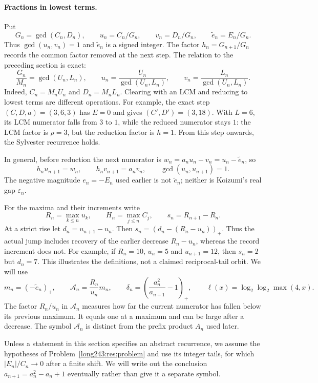 \documentclass[11pt]{article}
\begin{document}
\paragraph{Fractions in lowest terms.}
Put
\[
 G_n=\gcd(C_n,D_n),\qquad u_n=C_n/G_n,\qquad v_n=D_n/G_n,
 \qquad \tilde e_n=E_n/G_n.
\]
Thus $\gcd(u_n,v_n)=1$ and $\tilde e_n$ is a signed integer.
The factor $h_n=G_{n+1}/G_n$ records the common factor removed at the next
step. The relation to the preceding section is exact:
\[
 \frac{G_n}{M_n}=\gcd(U_n,L_n),\qquad
 u_n=\frac{U_n}{\gcd(U_n,L_n)},\qquad
 v_n=\frac{L_n}{\gcd(U_n,L_n)}.
\]
Indeed, $C_n=M_nU_n$ and $D_n=M_nL_n$.
Clearing with an LCM and reducing to lowest terms are different operations.
For example, the exact step $(C,D,a)=(3,6,3)$ has $E=0$ and gives
$(C',D')=(3,18)$. With $L=6$, its LCM numerator falls from $3$ to $1$,
while the reduced numerator stays $1$: the LCM factor is $\rho=3$,
but the reduction factor is $h=1$. From this step onwards, the Sylvester recurrence holds.

In general, before reduction the next numerator is
$w_n=a_nu_n-v_n=u_n-\tilde e_n$, so
\[
 h_nu_{n+1}=w_n,\qquad h_nv_{n+1}=a_nv_n,\qquad
 \gcd(u_n,u_{n+1})=1.
\]
The negative magnitude $e_n=-E_n$ used earlier is not $\tilde e_n$;
neither is Koizumi's real gap $\varepsilon_n$.

For the maxima and their increments write
\[
 R_n=\max_{k\le n}u_k,\qquad H_n=\max_{j\le n}C_j,
 \qquad s_n=R_{n+1}-R_n.
\]
At a strict rise let $d_n=u_{n+1}-u_n$. Then
$s_n=(d_n-(R_n-u_n))_+$. Thus the actual jump includes recovery of
the earlier decrease $R_n-u_n$, whereas the record increment does not. For example,
if $R_n=10$, $u_n=5$ and $u_{n+1}=12$, then $s_n=2$ but $d_n=7$.
This illustrates the definitions, not a claimed reciprocal-tail orbit.
We will use
\[
 m_n=(-\tilde e_n)_+,\qquad \mathcal A_n=\frac{R_n}{u_n}m_n,
 \qquad \delta_n=\left(\frac{a_n^2}{a_{n+1}}-1\right)_+,
 \qquad \ell(x)=\log_2\log_2\max(4,x).
\]
The factor $R_n/u_n$ in $\mathcal A_n$ measures how far the current
numerator has fallen below its previous maximum. It equals one at a
maximum and can be large after a decrease. The symbol $\mathcal A_n$
is distinct from the prefix product $A_n$ used later.

Unless a statement in this section specifies an abstract recurrence,
we assume the hypotheses of Problem~\ref{long243:res:problem} and use
its integer tails, for which $|E_n|/C_n\to0$ after a finite shift.
We will write out the conclusion $a_{n+1}=a_n^2-a_n+1$ eventually
rather than give it a separate symbol.
\end{document}
